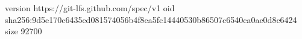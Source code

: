 version https://git-lfs.github.com/spec/v1
oid sha256:9d5e170c6435ed081574056b4f8ea5fc14440530b86507c6540ca0ae0d8c6424
size 92700
